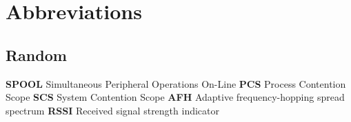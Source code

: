\appendix
\chapter{Abbreviations}
\section{Random}
\textbf{SPOOL} Simultaneous Peripheral Operations On-Line
\textbf{PCS} Process Contention Scope
\textbf{SCS} System Contention Scope
\textbf{AFH} Adaptive frequency-hopping spread spectrum
\textbf{RSSI} Received signal strength indicator
